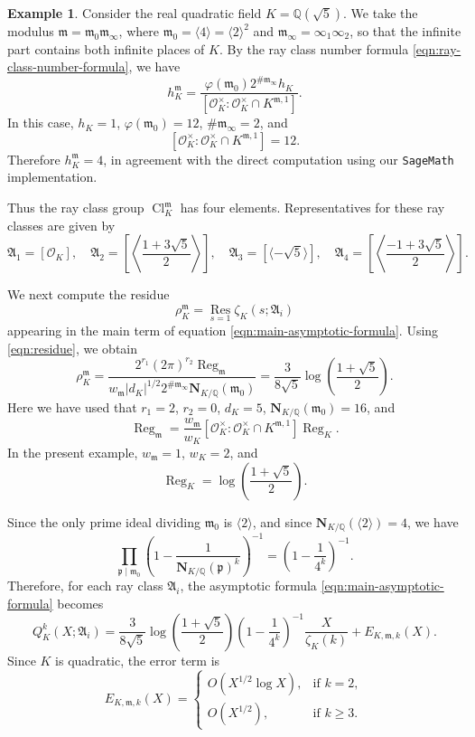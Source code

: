 \documentclass[11pt, reqno]{amsart}
\numberwithin{equation}{section}
\newcommand{\Q}{\mathbb{Q}}
\newcommand{\Cl}{\operatorname{Cl}}
\newcommand{\Nrm}[2]{\mathbf{N}_{#1}(#2)}
\theoremstyle{definition}
\newtheorem{example}[theorem]{Example}
\begin{document}
\begin{example}\label{example:nontrivial-ray-class-example}
Consider the real quadratic field $K=\Q(\sqrt{5})$. We take the modulus
$\mathfrak{m}=\mathfrak{m}_0\mathfrak{m}_{\infty}$, where
$\mathfrak{m}_0=\langle 4\rangle=\langle 2\rangle^2$ and
$\mathfrak{m}_{\infty}=\infty_1\infty_2$, so that the infinite part contains both infinite places of $K$.
By the ray class number formula \eqref{eqn:ray-class-number-formula}, we have
\[
h_K^{\mathfrak{m}}
=
\frac{\varphi(\mathfrak{m}_0)2^{\#\mathfrak{m}_{\infty}}h_K}
{\left[\mathcal{O}_K^{\times}:\mathcal{O}_K^{\times}\cap K^{\mathfrak{m},1}\right]}.
\]
In this case, $h_K=1$, $\varphi(\mathfrak{m}_0)=12$, $\#\mathfrak{m}_{\infty}=2$, and
\[
\left[\mathcal{O}_K^{\times}:\mathcal{O}_K^{\times}\cap K^{\mathfrak{m},1}\right]=12.
\]
Therefore $h_K^{\mathfrak{m}}=4$, in agreement with the direct computation using our \texttt{SageMath} implementation.

Thus the ray class group $\Cl_K^{\mathfrak{m}}$ has four elements. Representatives for these ray classes are given by
\[
\mathfrak{A}_1=[\mathcal{O}_K],
\quad
\mathfrak{A}_2=
\left[
\left\langle
\frac{1+3\sqrt{5}}{2}
\right\rangle
\right],
\quad
\mathfrak{A}_3=
[\langle -\sqrt{5}\rangle],
\quad
\mathfrak{A}_4=
\left[
\left\langle
\frac{-1+3\sqrt{5}}{2}
\right\rangle
\right].
\]

We next compute the residue
\[
\rho_K^{\mathfrak{m}}
=
\operatorname*{Res}_{s=1}\zeta_K(s;\mathfrak{A}_i)
\]
appearing in the main term of equation \eqref{eqn:main-asymptotic-formula}. Using \eqref{eqn:residue}, we obtain
\[
\rho_K^{\mathfrak{m}}
=
\frac{
2^{r_1}(2\pi)^{r_2}\operatorname{Reg}_{\mathfrak{m}}
}{
w_{\mathfrak{m}}|d_K|^{1/2}2^{\#\mathfrak{m}_{\infty}}\Nrm{K/\Q}{\mathfrak{m}_0}
}
=
\frac{3}{8\sqrt{5}}
\log\left(\frac{1+\sqrt{5}}{2}\right).
\]
Here we have used that $r_1=2$, $r_2=0$, $d_K=5$,
$\Nrm{K/\Q}{\mathfrak{m}_0}=16$, and
\[
\operatorname{Reg}_{\mathfrak{m}}
=
\frac{w_{\mathfrak{m}}}{w_K}
\left[\mathcal{O}_K^{\times}:\mathcal{O}_K^{\times}\cap K^{\mathfrak{m},1}\right]
\operatorname{Reg}_K.
\]
In the present example, $w_{\mathfrak{m}}=1$, $w_K=2$, and
\[
\operatorname{Reg}_K
=
\log\left(\frac{1+\sqrt{5}}{2}\right).
\]

Since the only prime ideal dividing $\mathfrak{m}_0$ is $\langle 2\rangle$, and since
$\Nrm{K/\Q}{\langle 2\rangle}=4$, we have
\[
\prod_{\mathfrak{p}\mid \mathfrak{m}_0}
\left(
1-\frac{1}{\Nrm{K/\Q}{\mathfrak{p}}^k}
\right)^{-1}
=
\left(1-\frac{1}{4^k}\right)^{-1}.
\]
Therefore, for each ray class $\mathfrak{A}_i$, the asymptotic formula
\eqref{eqn:main-asymptotic-formula} becomes
\[
Q_K^k(X;\mathfrak{A}_i)
=
\frac{3}{8\sqrt{5}}
\log\left(\frac{1+\sqrt{5}}{2}\right)
\left(1-\frac{1}{4^k}\right)^{-1}
\frac{X}{\zeta_K(k)}
+
E_{K,\mathfrak{m},k}(X).
\]
Since $K$ is quadratic, the error term is
\[
E_{K,\mathfrak{m},k}(X)
=
\begin{cases}
O\left(X^{1/2}\log X\right),
&
\text{if } k=2,
\\[6pt]
O\left(X^{1/2}\right),
&
\text{if } k\geq3.
\end{cases}
\]


\end{example}
\end{document}
